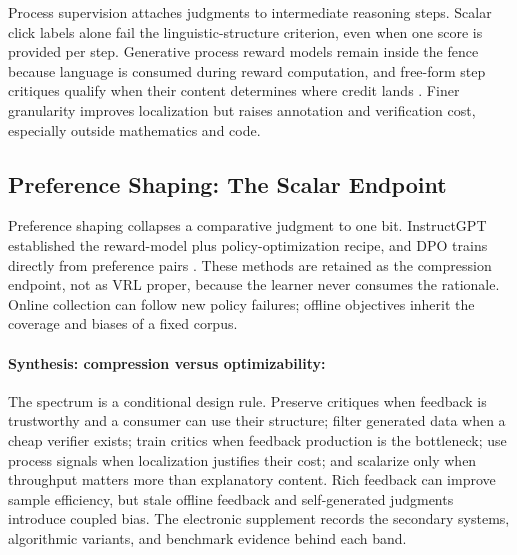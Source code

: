 Process supervision attaches judgments to intermediate reasoning steps. Scalar click labels alone fail the linguistic-structure criterion, even when one score is provided per step. Generative process reward models remain inside the fence because language is consumed during reward computation, and free-form step critiques qualify when their content determines where credit lands \citep{lightman2024let,zhao2025genprm}. Finer granularity improves localization but raises annotation and verification cost, especially outside mathematics and code.

\subsection{Preference Shaping: The Scalar Endpoint}
\label{subsec:preference-shaping}

Preference shaping collapses a comparative judgment to one bit. InstructGPT established the reward-model plus policy-optimization recipe, and DPO trains directly from preference pairs \citep{ouyang2022training,rafailov2023direct}. These methods are retained as the compression endpoint, not as VRL proper, because the learner never consumes the rationale. Online collection can follow new policy failures; offline objectives inherit the coverage and biases of a fixed corpus.

\paragraph{Synthesis: compression versus optimizability:}
The spectrum is a conditional design rule. Preserve critiques when feedback is trustworthy and a consumer can use their structure; filter generated data when a cheap verifier exists; train critics when feedback production is the bottleneck; use process signals when localization justifies their cost; and scalarize only when throughput matters more than explanatory content. Rich feedback can improve sample efficiency, but stale offline feedback and self-generated judgments introduce coupled bias. The electronic supplement records the secondary systems, algorithmic variants, and benchmark evidence behind each band.
